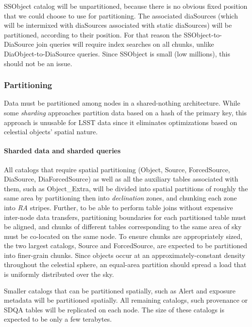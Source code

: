 \documentclass[DM,toc]{lsstdoc}
\begin{document}
SSObject catalog will be unpartitioned, because there is no obvious
fixed position that we could choose to use for partitioning. The
associated diaSources (which will be intermixed with diaSources
associated with static diaSources) will be partitioned, according to their
position. For that reason the SSObject-to-DiaSource join queries will
require index searches on all chunks, unlike DiaObject-to-DiaSource
queries. Since SSObject is small (low millions), this should not be an
issue.

\subsubsection{Partitioning}\label{partitioning}

Data must be partitioned among nodes in a shared-nothing architecture.
While some \emph{sharding} approaches partition data based on a hash of
the primary key, this approach is unusable for LSST data since it
eliminates optimizations based on celestial objects' spatial nature.

\paragraph{Sharded data and sharded
queries}\label{sharded-data-and-sharded-queries}

All catalogs that require spatial partitioning (Object, Source,
ForcedSource, DiaSource, DiaForcedSource) as well as all the auxiliary
tables associated with them, such as Object\_Extra, will be
divided into spatial partitions of roughly the same area by partitioning
then into \emph{declination} zones, and chunking each zone into
\emph{RA} stripes. Further, to be able to perform table joins without
expensive inter-node data transfers, partitioning boundaries for each
partitioned table must be aligned, and chunks of different tables
corresponding to the same area of sky must be co-located on the same
node. To ensure chunks are appropriately sized, the two largest
catalogs, Source and ForcedSource, are expected to be partitioned into
finer-grain chunks. Since objects occur at an approximately-constant
density throughout the celestial sphere, an equal-area partition should
spread a load that is uniformly distributed over the sky.

Smaller catalogs that can be partitioned spatially, such as Alert and
exposure metadata will be partitioned spatially. All remaining catalogs,
such provenance or SDQA tables will be replicated on each node. The size
of these catalogs is expected to be only a few terabytes.
\end{document}
